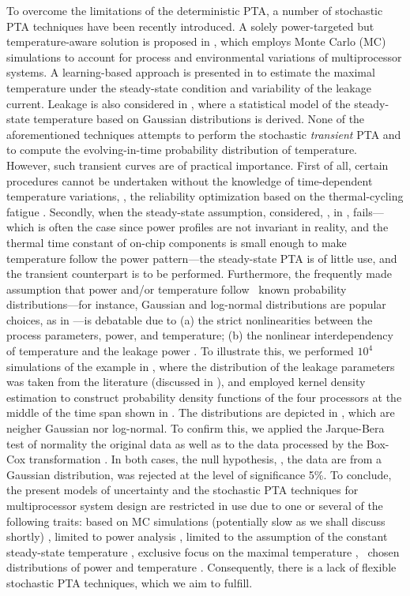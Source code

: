 To overcome the limitations of the deterministic PTA, a number of stochastic PTA techniques have been recently introduced. A solely power-targeted but temperature-aware solution is proposed in \cite{chandra2010}, which employs Monte Carlo (MC) simulations to account for process and environmental variations of multiprocessor systems. A learning-based approach is presented in \cite{juan2011} to estimate the maximal temperature under the steady-state condition and variability of the leakage current. Leakage is also considered in \cite{juan2012}, where a statistical model of the steady-state temperature based on Gaussian distributions is derived. None of the aforementioned techniques attempts to perform the stochastic \emph{transient} PTA and to compute the evolving-in-time probability distribution of temperature. However, such transient curves are of practical importance. First of all, certain procedures cannot be undertaken without the knowledge of time-dependent temperature variations, \eg, the reliability optimization based on the thermal-cycling fatigue \cite{ukhov2012}. Secondly, when the steady-state assumption, considered, \eg, in \cite{juan2011, juan2012}, fails---which is often the case since power profiles are not invariant in reality, and the thermal time constant of on-chip components is small enough to make temperature follow the power pattern---the steady-state PTA is of little use, and the transient counterpart is to be performed. Furthermore, the frequently made assumption that power and/or temperature follow \apriori\ known probability distributions---for instance, Gaussian and log-normal distributions are popular choices, as in \cite{juan2012, srivastava2010}---is debatable due to (a) the strict nonlinearities between the process parameters, power, and temperature; (b) the nonlinear interdependency of temperature and the leakage power \cite{liu2007}. To illustrate this, we performed $10^4$ simulations of the example in , where the distribution of the leakage parameters was taken from the literature (discussed in ), and employed kernel density estimation to construct probability density functions of the four processors at the middle of the time span shown in . The distributions are depicted in , which are neigher Gaussian nor log-normal. To confirm this, we applied the Jarque-Bera test \cite{juan2012} of normality the original data as well as to the data processed by the Box-Cox transformation \cite{juan2012}. In both cases, the null hypothesis, \ie, the data are from a Gaussian distribution, was rejected at the level of significance 5\%. To conclude, the present models of uncertainty and the stochastic PTA techniques for multiprocessor system design are restricted in use due to one or several of the following traits: based on MC simulations (potentially slow as we shall discuss shortly) \cite{chandra2010}, limited to power analysis \cite{chandra2010}, limited to the assumption of the constant steady-state temperature \cite{juan2011, juan2012}, exclusive focus on the maximal temperature \cite{juan2011}, \apriori\ chosen distributions of power and temperature \cite{juan2012, srivastava2010}. Consequently, there is a lack of flexible stochastic PTA techniques, which we aim to fulfill.

